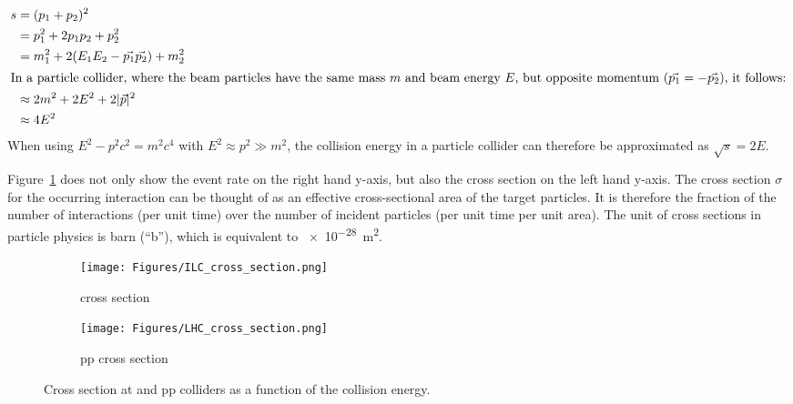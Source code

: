 \begin{align*}
 s &= (p_1+p_2)^2\\
 &=p_1^2+2p_1p_2+p_2^2\\
 &=m_1^2+2(E_1E_2-\vec{p_1}\vec{p_2})+m_2^2\\
\intertext{In a particle collider, where the beam particles have the same mass $m$ and beam energy $E$, but opposite momentum ($\vec{p_1}=-\vec{p_2}$), it follows:}
&\approx2m^2+2E^2+2|\vec{p}|^2\\
&\approx4E^2
\end{align*}
When using $E^2-p^2c^2=m^2c^4$ with $E^2\approx p^2 \gg m^2$, the collision energy in a particle collider can therefore be approximated as $\sqrt{s}=2E$.

Figure~\ref{fig:Cross_sections} does not only show the event rate on the right hand y-axis, but also the cross section on the left hand y-axis.
The cross section $\sigma$ for the occurring interaction can be thought of as an effective cross-sectional area of the target particles.
It is therefore the fraction of the number of interactions (per unit time) over the number of incident particles (per unit time per unit area).
The unit of cross sections in particle physics is barn (``b''), which is equivalent to \SI{e-28}{\meter\squared}.

\begin{figure}[h!]
\centering
\begin{subfigure}[b]{0.4\textwidth}
\texttt{[image: Figures/ILC\_cross\_section.png]}
\caption{\positron \electron cross section~\cite{ILC_cross}}
\end{subfigure}
\begin{subfigure}[b]{0.4\textwidth}
\texttt{[image: Figures/LHC\_cross\_section.png]}
\caption{pp cross section~\cite{LHC_cross}}
\end{subfigure}
\caption[Cross sections for ILC and LHC]{Cross section at \positron \electron and pp colliders as a function of the collision energy. }%
\label{fig:Cross_sections}
\end{figure}

